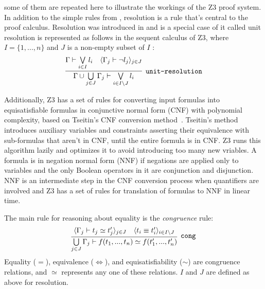 \documentclass{article}
\begin{document}
		some of them are repeated here to illustrate 
		the workings of the Z3 proof system. In addition
		to the simple rules from ,
		resolution is a rule that's central to the 
		proof calculus. Resolution was introduced in 
		 and is a special case of it 
		called unit resolution is represented as follows in 
		the sequent calculus of Z3, where 
		$I = \{1,...,n\}$ and $J$ is a non-empty 
		subset of $I$ :\\
		\begin{equation*}
			\infer[\texttt{unit-resolution}]
				{\Gamma \cup \bigcup\limits_{j \in J}\Gamma_j \vdash \bigvee\limits_{i \in I\setminus J} l_i}
				{\Gamma \vdash \bigvee\limits_{i \in I}l_i & \langle \Gamma_j \vdash \neg l_j \rangle_{j \in J}}
		\end{equation*}
		
		Additionally, Z3 has a set of rules for converting 
		input formulas into equisatisfiable formulas in 
		conjunctive normal form (CNF) with polynomial 
		complexity, based on Tseitin's CNF conversion 
		method~\cite{Tseitin1983}. Tseitin's method 
		introduces auxiliary variables and constraints 
		asserting their equivalence with sub-formulas 
		that aren't in CNF, until the entire formula 
		is in CNF. Z3 runs this algorithm lazily and 
		optimizes it to avoid introducing too many 
		new vriables. A formula is in negation normal 
		form (NNF) if negations are applied only to
		variables and the only Boolean operators 
		in it are conjunction and disjunction. 
		NNF is an intermediate step in the CNF 
		conversion process when quantifiers are 
		involved and Z3 has a set of rules for 
		translation of formulas to NNF in linear time.
		
		The main rule for reasoning about equality 
		is the \textit{congruence} rule:
		\begin{equation*}
			\infer[\texttt{cong}]
				{\bigcup\limits_{j\in J}\Gamma_j \vdash f(t_1, ..., t_n) \simeq f(t_1^{\prime},...,t_n^{\prime})}
				{\langle \Gamma_j \vdash t_j \simeq t_j^{\prime} \rangle_{j \in J} & 
				\langle t_i \equiv t_i^{\prime} \rangle_{i \in I\setminus J}}
		\end{equation*}
		Equality ($=$), equivalence ($\iff$), and 
		equisatisfiability ($\sim$) are congruence 
		relations, and $\simeq$ represents any one 
		of these relations. $I$ and $J$ are defined 
		as above for resolution.
		
\end{document}
